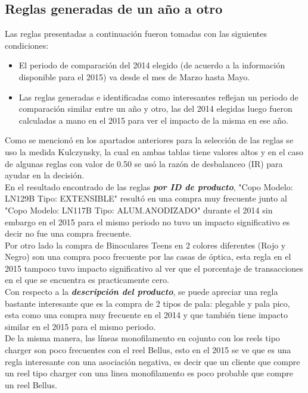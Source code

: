 \documentclass[]{article}
\begin{document}
	\subsection{Reglas generadas de un año a otro}
	Las reglas presentadas a continuación fueron tomadas con las siguientes condiciones:
	\begin{itemize}
		\item El periodo de comparación del 2014 elegido (de acuerdo a la información disponible para el 2015) va desde el mes de Marzo hasta Mayo.
		\item Las reglas generadas e identificadas como interesantes reflejan un periodo de comparación similar entre un año y otro, las del 2014 elegidas luego fueron calculadas a mano en el 2015 para ver el impacto de la misma en ese año.
	\end{itemize}
	
	Como se mencionó en los apartados anteriores para la selección de las reglas se uso la medida Kulczynsky, la cual en ambas tablas tiene valores altos y en el caso de algunas reglas con valor de 0.50 se usó la razón de desbalanceo (IR) para ayudar en la decisión.\\
	
	En el resultado encontrado de las reglas \textit{\textbf{por ID de producto}}, "Copo Modelo: LN129B Tipo: EXTENSIBLE" resultó en una compra muy frecuente junto al "Copo Modelo: LN117B Tipo: ALUM.ANODIZADO" durante el 2014 sin embargo en el 2015 para el mismo periodo no tuvo un impacto significativo es decir no fue una compra frecuente.\\
	
	Por otro lado la compra de Binoculares Teens en 2 colores diferentes (Rojo y Negro) son una compra poco frecuente por las casas de óptica, esta regla en el 2015 tampoco tuvo impacto significativo al ver que el porcentaje de transacciones en el que se encuentra es practicamente cero.\\
	
	Con respecto a la \textit{\textbf{descripción del producto}}, se puede apreciar una regla bastante interesante que es la compra de 2 tipos de pala: plegable y pala pico, esta como una compra muy frecuente en el 2014 y que también tiene impacto similar en el 2015 para el mismo periodo.\\
	
	De la misma manera, las líneas monofilamento en cojunto con los reels tipo charger son poco frecuentes con el reel Bellus, esto en el 2015 se ve que es una regla interesante con una asociación negativa, es decir que un cliente que compre un reel tipo charger con una linea monofilamento es poco probable que compre un reel Bellus.\\
	
\end{document}
